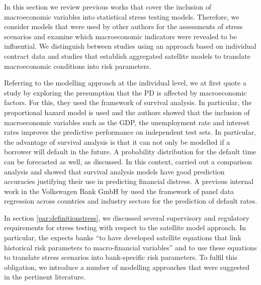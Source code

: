 \documentclass[a4paper, 11pt]{scrreprt}
\begin{document}
\bigskip

In this section we review previous works that cover the inclusion of macroeconomic variables into statistical stress testing models. Therefore, we consider models that were used by other authors for the assessments of stress scenarios and examine which macroeconomic indicators were revealed to be influential.
We distinguish between studies using an approach based on individual contract data and studies that establish aggregated satellite models to translate macroeconomic conditions into risk parameters.

Referring to the modelling approach at the individual level, we at first quote a study by
\textcite{bellotti2009credit} exploring the presumption that the PD is affected by macroeconomic factors. For this, they used the framework of survival analysis. In particular, the \textcite{cox1984survival} proportional hazard model is used and the authors showed that the inclusion of macroeconomic variables such as the GDP, the unemployment rate and interest rates improves the predictive performance on independent test sets. In particular, the advantage of survival analysis is that it can not only be modelled if a borrower will default in the future. A probability distribution for the default time can be forecasted as well, as \textcite{banasik1999notifbutwhen} discussed.
In this context, \textcite{gepp2015predicting} carried out a comparison analysis and showed that survival analysis models have good prediction accuracies justifying their use in predicting financial distress.
A previous internal work in the Volkswagen Bank GmbH by \textcite{ivanchenko2017predicting} used the framework of panel data regression across countries and industry sectors for the prediction of default rates.

In section \ref{par:definitionstress}, we discussed several supervisory and regulatory requirements for stress testing with respect to the satellite model approach. 
In particular, the \textcite[p. 17]{ecb2018srep} expects banks ``to have developed satellite equations that link historical risk parameters to macro-financial variables'' and to use these equations to translate stress scenarios into bank-specific risk parameters. To fulfil this obligation, we introduce a number of modelling approaches that were suggested in the pertinent literature. 
\end{document}
